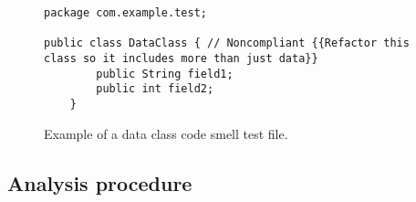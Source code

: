 \begin{figure} [htb]
    \begin{lstlisting}
package com.example.test;

public class DataClass { // Noncompliant {{Refactor this class so it includes more than just data}}
        public String field1;
        public int field2;
    }
    \end{lstlisting}
    \caption{Example of a data class code smell test file.}
    \label{data_class_example}
\end{figure}


\subsection{Analysis procedure}\label{subsec:analysis-procedure}

